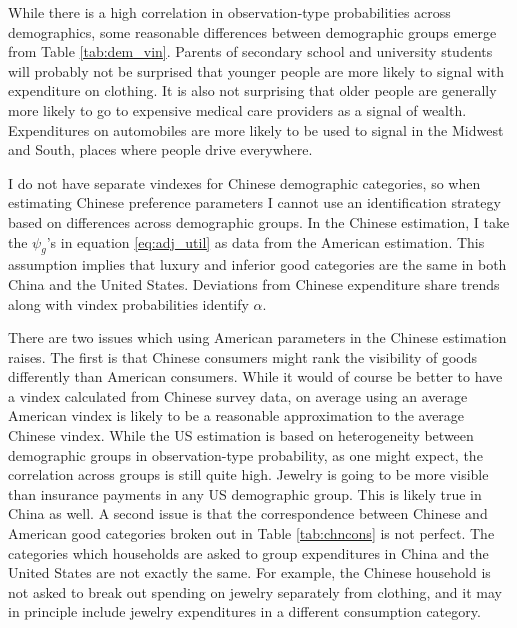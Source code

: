 \documentclass[11pt]{article}
\begin{document}
\begin{CJK}{UTF8}{gbsn}
While there is a high correlation in observation-type probabilities across demographics, some reasonable differences between demographic groups emerge from Table \ref{tab:dem_vin}.  Parents of secondary school and university students will probably not be surprised that younger people are more likely to signal with expenditure on clothing.  It is also not surprising that older people are generally more likely to go to expensive medical care providers as a signal of wealth.  Expenditures on automobiles are more likely to be used to signal in the Midwest and South, places where people drive everywhere.

I do not have separate vindexes for Chinese demographic categories, so when estimating Chinese preference parameters I cannot use an identification strategy based on differences across demographic groups.  In the Chinese estimation, I take the $\psi_g$'s in equation \eqref{eq:adj_util} as data from the American estimation.  This assumption implies that luxury and inferior good categories are the same in both China and the United States. Deviations from Chinese expenditure share trends along with vindex probabilities identify $\alpha$. 

There are two issues which using American parameters in the Chinese estimation raises.  The first is that Chinese consumers might rank the visibility of goods differently than American consumers.  While it would of course be better to have a vindex calculated from Chinese survey data, on average using an average American vindex is likely to be a reasonable approximation to the average Chinese vindex.  While the US estimation is based on heterogeneity between demographic groups in observation-type probability, as one might expect, the correlation across groups is still quite high.  Jewelry is going to be more visible than insurance payments in any US demographic group.  This is likely true in China as well.  A second issue is that the correspondence between Chinese and American good categories broken out in Table \ref{tab:chncons} is not perfect. The categories which households are asked to group expenditures in China and the United States are not exactly the same.  For example, the Chinese household is not asked to break out spending on jewelry separately from clothing, and it may in principle include jewelry expenditures in a different consumption category.  


\end{CJK}
\end{document}
